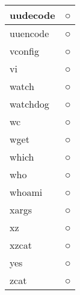 \begin{longtable}{p{80mm}p{80mm}}
uudecode & ○ \\ \hline
uuencode & ○ \\ \hline
vconfig & ○ \\ \hline
vi & ○ \\ \hline
watch & ○ \\ \hline
watchdog & ○ \\ \hline
wc & ○ \\ \hline
wget & ○ \\ \hline
which & ○ \\ \hline
who & ○ \\ \hline
whoami & ○ \\ \hline
xargs & ○ \\ \hline
xz & ○ \\ \hline
xzcat & ○ \\ \hline
yes & ○ \\ \hline
zcat & ○ \\ \hline
\end{longtable}
















